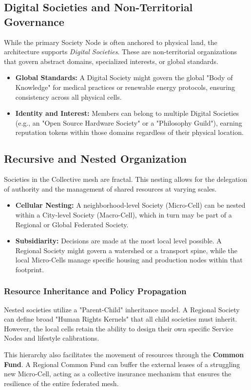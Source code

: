 \subsection{Digital Societies and Non-Territorial Governance}
While the primary Society Node is often anchored to physical land, the architecture supports \textit{Digital Societies}. These are non-territorial organizations that govern abstract domains, specialized interests, or global standards.
\begin{itemize}[leftmargin=*]
    \item \textbf{Global Standards:} A Digital Society might govern the global "Body of Knowledge" for medical practices or renewable energy protocols, ensuring consistency across all physical cells.
    \item \textbf{Identity and Interest:} Members can belong to multiple Digital Societies (e.g., an "Open Source Hardware Society" or a "Philosophy Guild"), earning reputation tokens within those domains regardless of their physical location.
\end{itemize}

\subsection{Recursive and Nested Organization}
Societies in the Collective mesh are fractal. This nesting allows for the delegation of authority and the management of shared resources at varying scales.
\begin{itemize}[leftmargin=*]
    \item \textbf{Cellular Nesting:} A neighborhood-level Society (Micro-Cell) can be nested within a City-level Society (Macro-Cell), which in turn may be part of a Regional or Global Federated Society.
    \item \textbf{Subsidiarity:} Decisions are made at the most local level possible. A Regional Society might govern a watershed or a transport spine, while the local Micro-Cells manage specific housing and production nodes within that footprint.
\end{itemize}

\subsubsection{Resource Inheritance and Policy Propagation}
Nested societies utilize a "Parent-Child" inheritance model. A Regional Society can define broad "Human Rights Kernels" that all child societies must inherit. However, the local cells retain the ability to design their own specific Service Nodes and lifestyle calibrations. 

This hierarchy also facilitates the movement of resources through the \textbf{Common Fund}. A Regional Common Fund can buffer the external leases of a struggling new Micro-Cell, acting as a collective insurance mechanism that ensures the resilience of the entire federated mesh.
